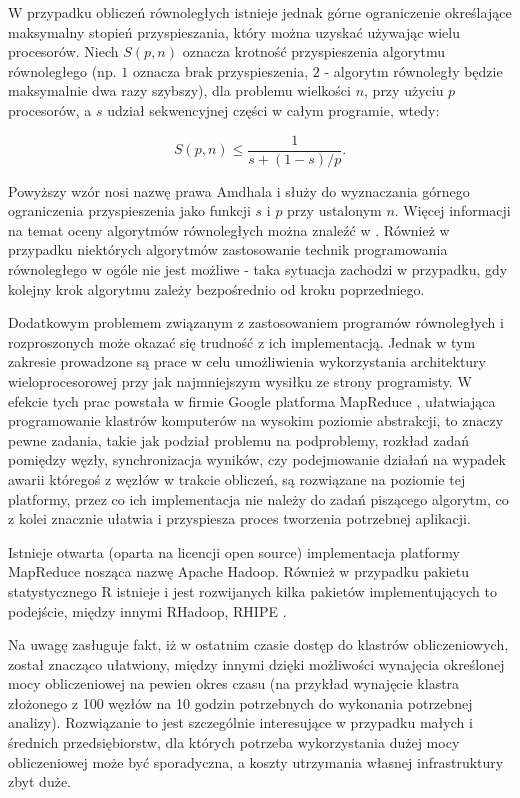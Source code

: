 \documentclass[man,mfu]{mgrwms}
\begin{document}
W przypadku obliczeń równoległych istnieje jednak górne ograniczenie określające maksymalny stopień przyspieszania, który można uzyskać używając wielu procesorów. Niech $S(p,n)$ oznacza krotność przyspieszenia algorytmu równoległego (np. $1$ oznacza brak przyspieszenia, $2$ - algorytm równoległy będzie maksymalnie dwa razy szybszy), dla problemu wielkości $n$, przy użyciu $p$ procesorów, a $s$ udział sekwencyjnej części w całym programie, wtedy:

\begin{equation}
S(p,n) \leq \frac{1}{s+(1-s)/p}.
\end{equation}

Powyższy wzór nosi nazwę prawa Amdhala i służy do wyznaczania górnego ograniczenia przyspieszenia jako funkcji $s$ i $p$ przy ustalonym $n$.  Więcej informacji na temat oceny algorytmów równoległych można znaleźć w \cite{Czech2010}. Również w przypadku niektórych algorytmów zastosowanie technik programowania równoległego w ogóle nie jest możliwe - taka sytuacja zachodzi w przypadku, gdy kolejny krok algorytmu zależy bezpośrednio od kroku poprzedniego.

Dodatkowym problemem związanym z zastosowaniem programów równoległych i rozproszonych może okazać się trudność z ich implementacją. Jednak w tym zakresie prowadzone są prace w celu umożliwienia wykorzystania architektury wieloprocesorowej przy jak najmniejszym wysiłku ze strony programisty. W efekcie tych prac powstała w firmie Google platforma MapReduce \cite{mapreduce}, ułatwiająca programowanie klastrów komputerów na wysokim poziomie abstrakcji, to znaczy pewne zadania, takie jak podział problemu na podproblemy, rozkład zadań pomiędzy węzły, synchronizacja wyników, czy podejmowanie działań na wypadek awarii któregoś z węzłów w trakcie obliczeń, są rozwiązane na poziomie tej platformy, przez co ich implementacja nie należy do zadań piszącego algorytm, co z kolei znacznie ułatwia i przyspiesza proces tworzenia potrzebnej aplikacji. 

Istnieje otwarta (oparta na licencji open source) implementacja platformy MapReduce nosząca nazwę Apache Hadoop. Również w przypadku pakietu statystycznego R istnieje i jest rozwijanych kilka pakietów implementujących to podejście, między innymi RHadoop, RHIPE \cite{rhipe}.

Na uwagę zasługuje fakt, iż w ostatnim czasie dostęp do klastrów obliczeniowych, został znacząco ułatwiony, między innymi dzięki możliwości wynajęcia określonej mocy obliczeniowej na pewien okres czasu (na przykład wynajęcie klastra złożonego z 100 węzłów na 10 godzin potrzebnych do wykonania potrzebnej analizy). Rozwiązanie to jest szczególnie interesujące w przypadku małych i średnich przedsiębiorstw, dla których potrzeba wykorzystania dużej mocy obliczeniowej może być sporadyczna, a koszty utrzymania własnej infrastruktury zbyt duże. 
\end{document}
